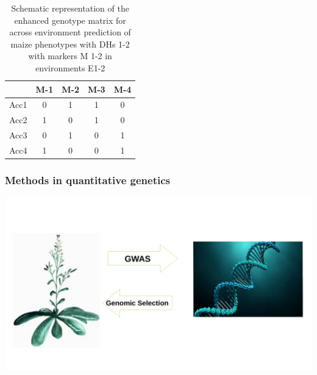 \documentclass{beamer}
\begin{document}
\begin{frame}
\begin{table}[H]
 \centering
 \caption[Environmentally enhanced marker matrix]{Schematic representation of the enhanced genotype matrix for across environment prediction of maize phenotypes with DHs 1-2 with markers M 1-2 in environments E1-2}
 \label{tab:envmarker}
 \begin{tabular}{l|cccc}
   \hline
        & M-1 & M-2 & M-3 & M-4 \\
   \hline
   Acc1 & 0   & 1   & 1   & 0   \\
   Acc2 & 1   & 0   & 1   & 0   \\
   Acc3 & 0   & 1   & 0   & 1   \\
   Acc4 & 1   & 0   & 0   & 1   \\
   \hline
 \end{tabular}
\end{table}
\end{frame}


\begin{frame}
  \frametitle{Methods in quantitative genetics}
  \includegraphics[height=.8\textheight,width=.9\textwidth]{bla.pdf}
\end{frame}



 
\end{document}
